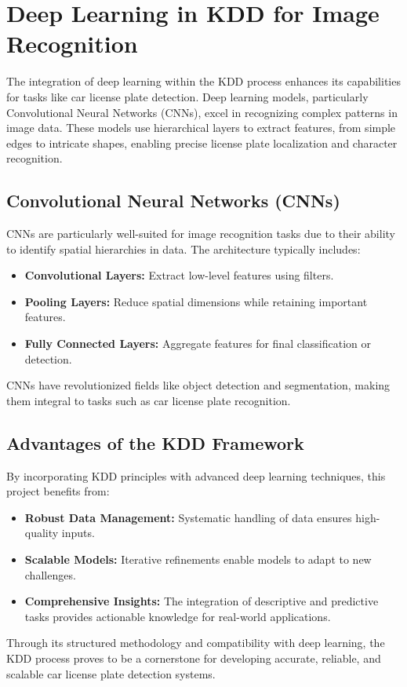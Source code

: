 \section{Deep Learning in KDD for Image Recognition}

The integration of deep learning within the KDD process enhances its capabilities for tasks like car license plate detection. Deep learning models, particularly Convolutional Neural Networks (CNNs), excel in recognizing complex patterns in image data. These models use hierarchical layers to extract features, from simple edges to intricate shapes, enabling precise license plate localization and character recognition.

\subsection{Convolutional Neural Networks (CNNs)}

CNNs are particularly well-suited for image recognition tasks due to their ability to identify spatial hierarchies in data. The architecture typically includes:
\begin{itemize}
\item \textbf{Convolutional Layers:} Extract low-level features using filters.
\item \textbf{Pooling Layers:} Reduce spatial dimensions while retaining important features.
\item \textbf{Fully Connected Layers:} Aggregate features for final classification or detection.
\end{itemize}

CNNs have revolutionized fields like object detection and segmentation, making them integral to tasks such as car license plate recognition.

\subsection{Advantages of the KDD Framework}

By incorporating KDD principles with advanced deep learning techniques, this project benefits from:
\begin{itemize}
\item \textbf{Robust Data Management:} Systematic handling of data ensures high-quality inputs.
\item \textbf{Scalable Models:} Iterative refinements enable models to adapt to new challenges.
\item \textbf{Comprehensive Insights:} The integration of descriptive and predictive tasks provides actionable knowledge for real-world applications.
\end{itemize}

Through its structured methodology and compatibility with deep learning, the KDD process proves to be a cornerstone for developing accurate, reliable, and scalable car license plate detection systems.
